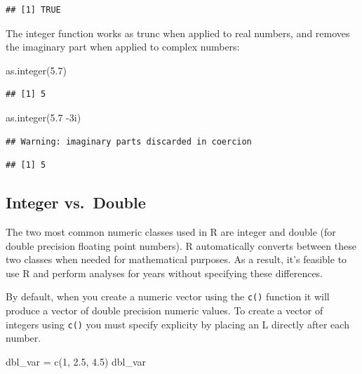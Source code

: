 \documentclass[
]{book}
\newenvironment{Shaded}{\begin{snugshade}}{\end{snugshade}}
\newcommand{\DecValTok}[1]{\textcolor[rgb]{0.00,0.00,0.81}{#1}}
\newcommand{\FloatTok}[1]{\textcolor[rgb]{0.00,0.00,0.81}{#1}}
\newcommand{\FunctionTok}[1]{\textcolor[rgb]{0.00,0.00,0.00}{#1}}
\newcommand{\NormalTok}[1]{#1}
\newcommand{\OtherTok}[1]{\textcolor[rgb]{0.56,0.35,0.01}{#1}}
\newcommand{\SpecialCharTok}[1]{\textcolor[rgb]{0.00,0.00,0.00}{#1}}
\begin{document}
\begin{verbatim}
## [1] TRUE
\end{verbatim}

The integer function works as trunc when applied to real numbers, and removes the imaginary part when
applied to complex numbers:

\begin{Shaded}
\begin{Highlighting}[]
\FunctionTok{as.integer}\NormalTok{(}\FloatTok{5.7}\NormalTok{)}
\end{Highlighting}
\end{Shaded}

\begin{verbatim}
## [1] 5
\end{verbatim}

\begin{Shaded}
\begin{Highlighting}[]
\FunctionTok{as.integer}\NormalTok{(}\FloatTok{5.7} \SpecialCharTok{{-}}\NormalTok{3i)}
\end{Highlighting}
\end{Shaded}

\begin{verbatim}
## Warning: imaginary parts discarded in coercion
\end{verbatim}

\begin{verbatim}
## [1] 5
\end{verbatim}

\hypertarget{integer-vs.-double}{%
\subsection{Integer vs.~Double}\label{integer-vs.-double}}

The two most common numeric classes used in R are integer and double (for double precision floating point numbers). R automatically converts between these two classes when needed for mathematical purposes. As a result, it's feasible to use R and perform analyses for years without specifying these differences.

By default, when you create a numeric vector using the \texttt{c()} function it will produce a vector of double precision numeric values. To create a vector of integers using \texttt{c()} you must specify explicity by placing an L directly after each number.

\begin{Shaded}
\begin{Highlighting}[]
\NormalTok{dbl\_var }\OtherTok{=} \FunctionTok{c}\NormalTok{(}\DecValTok{1}\NormalTok{, }\FloatTok{2.5}\NormalTok{, }\FloatTok{4.5}\NormalTok{)}
\NormalTok{dbl\_var}
\end{Highlighting}
\end{Shaded}
\end{document}
